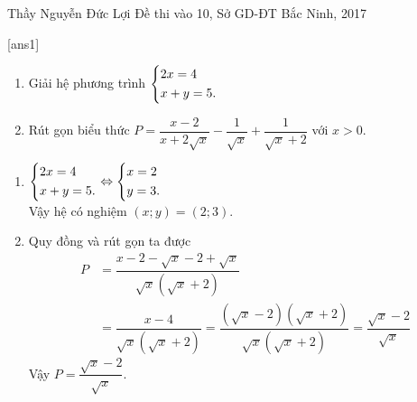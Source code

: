 \begin{name}
{Thầy  Nguyễn Đức Lợi}
{Đề thi vào 10, Sở GD-ĐT Bắc Ninh, 2017}
\end{name}
\setcounter{ex}{0}
[ans1]
\begin{ex}%
    \hfill
    \begin{enumerate}
        \item Giải hệ phương trình $\left\{\begin{aligned}&2x=4\\&x+y=5.\end{aligned}\right.$
        \item Rút gọn biểu thức $P=\dfrac{x-2}{x+2\sqrt{x}}-\dfrac{1}{\sqrt{x}}+\dfrac{1}{\sqrt{x}+2}$ với $x>0$.
    \end{enumerate}
\loigiai
    {
    \begin{enumerate}
        \item $\left\{\begin{aligned}&2x=4\\&x+y=5.\end{aligned}\right.\Leftrightarrow \left\{\begin{aligned}&x=2\\&y=3.\end{aligned}\right.$ \\
        Vậy hệ có nghiệm $(x;y)=(2;3).$
        \item Quy đồng và rút gọn ta được
        \begin{align*}
       		P &=\dfrac{x-2-\sqrt{x}-2+\sqrt{x}}{\sqrt{x}\left(\sqrt{x}+2\right)}\\
       		 &=\dfrac{x-4}{\sqrt{x}\left(\sqrt{x}+2\right)}=\dfrac{\left(\sqrt{x}-2\right)\left(\sqrt{x}+2\right)}{\sqrt{x}\left(\sqrt{x}+2\right)}=\dfrac{\sqrt{x}-2}{\sqrt{x}}
		\end{align*}         
        Vậy $P=\dfrac{\sqrt{x}-2}{\sqrt{x}}$.
    \end{enumerate}
    }
\end{ex}

